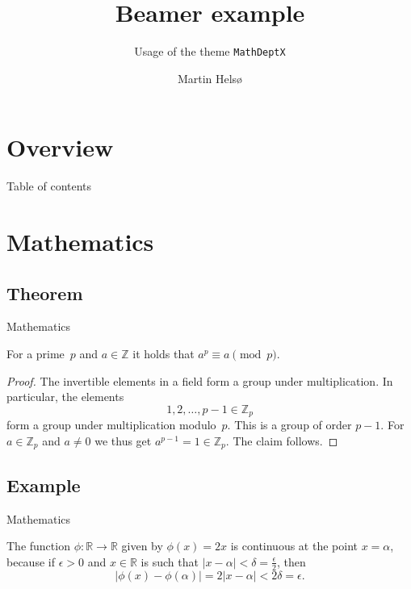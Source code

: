 \documentclass[UKenglish]{beamer}
\author{Martin Helsø}
\title{Beamer example}
\subtitle{Usage of the theme \texttt{MathDeptX}}
\begin{document}
\section{Overview}


%
%
\begin{frame}{Table of contents}
    \tableofcontents[currentsection]
\end{frame}


\section{Mathematics}
\subsection{Theorem}


\begin{frame}{Mathematics}
    \begin{theorem}
        For a prime~\(p\) and \(a \in \mathbb{Z}\) it holds that \(a^p \equiv a \pmod{p}\).
    \end{theorem}
    
    \begin{proof}
        The invertible elements in a field form a group under multiplication.
        In particular, the elements
        \begin{equation*}
            1, 2, \ldots, p - 1 \in \mathbb{Z}_p
        \end{equation*}
        form a group under multiplication modulo~\(p\).
        This is a group of order \(p - 1\).
        For \(a \in \mathbb{Z}_p\) and \(a \neq 0\) we thus get \(a^{p-1} = 1 \in \mathbb{Z}_p\).
        The claim follows.
    \end{proof}
\end{frame}


\subsection{Example}


\begin{frame}{Mathematics}
    \begin{example}
        The function \(\phi \colon \mathbb{R} \to \mathbb{R}\) given by \(\phi(x) = 2x\) is continuous at the point \(x = \alpha\),
        because if \(\epsilon > 0\) and \(x \in \mathbb{R}\) is such that \(\lvert x - \alpha \rvert < \delta = \frac{\epsilon}{2}\),
        then
        \begin{equation*}
            \lvert \phi(x) - \phi(\alpha)\rvert = 2\lvert x - \alpha \rvert < 2\delta = \epsilon.
        \end{equation*}
    \end{example}
\end{frame}
\end{document}
